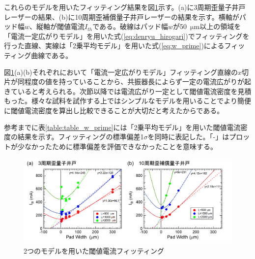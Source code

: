 これらのモデルを用いたフィッティング結果を図\ref{fig:fig_3_1_w_prime}示す。(a)に3周期歪量子井戸レーザーの結果、(b)に10周期歪補償量子井戸レーザーの結果を示す。横軸がパッド幅$w$、縦軸が閾値電流$I_{th}$である。破線はパッド幅$w$が50\ $\si{\micro\metre}$以上の領域を「電流一定広がりモデル」を用いた式(\ref{eq:denryu_hirogari})でフィッティングを行った直線、実線は「2乗平均モデル」を用いた式(\ref{eq:w_prime})によるフィッティング曲線である。

図\ref{fig:fig_3_1_w_prime}(a)(b)それぞれにおいて「電流一定広がりモデル」フィッティング直線の$x$切片が同程度の値を持っていることから、共振器長によらず一定の電流広がりが起きていると考えられる。次節以降では電流広がり一定として閾値電流密度を見積もった。様々な試料を試作する上ではシンプルなモデルを用いることでより簡便に閾値電流密度を算出し比較できることが大切だと考えたからである。


参考までに表\ref{table:table_w_prime}には「2乗平均モデル」を用いた閾値電流密度の結果を示す。フィッティングの標準偏差1$\sigma$を同時に表記した。「-」はプロットが少なかったために標準偏差を評価できなかったことを意味する。





\begin{figure}[h]
	\centering
	\includegraphics[width=15cm]{figure/fig_3_1_w_prime.png}
	\caption{2つのモデルを用いた閾値電流フィッティング}
	\label{fig:fig_3_1_w_prime}
\end{figure}

